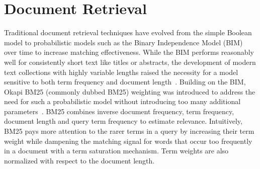 
\section{Document Retrieval}
\label{non-neural-retrieval}

Traditional document retrieval techniques have evolved from the simple Boolean model to probabilistic models such as the Binary Independence Model (BIM) over time to increase matching effectiveness.
While the BIM performs reasonably well for consistently short text like titles or abstracts, the development of modern text collections with highly variable lengths raised the necessity for a model sensitive to both term frequency and document length~\cite{Manning:2008:IIR:1394399}.
Building on the BIM, Okapi BM25 (commonly dubbed BM25) weighting was introduced to address the need for such a probabilistic model without introducing too many additional parameters~\cite{jones2000probabilistic}.
BM25 combines inverse document frequency, term frequency, document length and query term frequency to estimate relevance.
Intuitively, BM25 pays more attention to the rarer terms in a query by increasing their term weight while dampening the matching signal for words that occur too frequently in a document with a term saturation mechanism.
Term weights are also normalized with respect to the document length.

